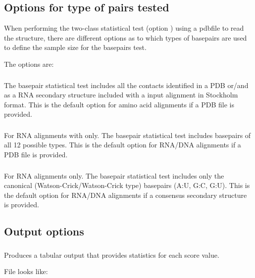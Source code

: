 \subsection{Options for type of pairs tested}

When performing the two-class statistical test (option )
using a pdbfile to read the structure, there are different options as
to which types of basepairs are used to define the sample size for the
basepairs test.

The options are:

\subsubsection{}
The basepair statistical test includes all the contacts identified in a PDB
or/and as a RNA secondary structure included with a input alignment in
Stockholm format.  This is the default option for amino acid
alignments if a PDB file is provided.  

\subsubsection{} For RNA alignments with only.
The basepair statistical test includes basepairs of all 12 possible types.
This is the default option for RNA/DNA alignments if a PDB file is
provided.  

\subsubsection{} For RNA alignments only.
The basepair statistical test includes only the canonical
(Watson-Crick/Watson-Crick type) basepairs (A:U, G:C, G:U).  This is
the default option for RNA/DNA alignments if a consensus secondary
structure is provided. 

\subsection{Output options}

\subsubsection{}

Produces a tabular output that provides statistics for each score value.

File  looks like:

